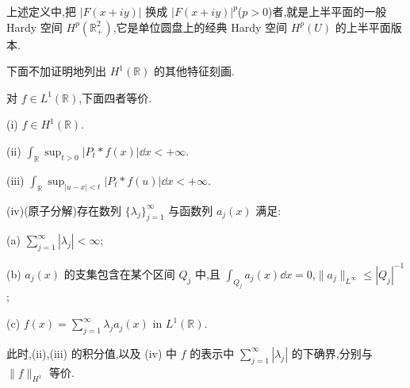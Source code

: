 上述定义中,把 $|F(x + iy)|$ 换成 $|F(x + iy)|^{p}$($p > 0$)者,就是上半平面的一般 Hardy 空间 $H^{p}(\mathbb{R}_{+}^{2})$,它是单位圆盘上的经典 Hardy 空间 $H^{p}(U)$ 的上半平面版本.

下面不加证明地列出 $H^{1}(\mathbb{R})$ 的其他特征刻画.

\begin{theorem}\label{thm:1.12.6}
对 $f \in L^{1}(\mathbb{R})$,下面四者等价.

(i) $f \in H^{1}(\mathbb{R})$.

(ii) $\displaystyle\int_{\mathbb{R}}\sup_{t>0}|P_{t} * f(x)|\dd x < +\infty$.

(iii) $\displaystyle\int_{\mathbb{R}}\sup_{|u - x| < t}|P_{t} * f(u)|\dd x < +\infty$.

(iv)(原子分解)存在数列 $\{\lambda_{j}\}_{j=1}^{\infty}$ 与函数列 $a_{j}(x)$ 满足:

(a) $\displaystyle\sum_{j=1}^{\infty}|\lambda_{j}| < \infty$;

(b) $a_{j}(x)$ 的支集包含在某个区间 $Q_{j}$ 中,且 $\int_{Q_{j}}a_{j}(x)\dd x = 0$,$\| a_{j} \|_{L^{\infty}} \leq |Q_{j}|^{-1}$;

(c) $f(x) = \displaystyle\sum_{j=1}^{\infty}\lambda_{j}a_{j}(x)$ in $L^{1}(\mathbb{R})$.

此时,(ii),(iii) 的积分值,以及 (iv) 中 $f$ 的表示中 $\displaystyle\sum_{j=1}^{\infty}|\lambda_{j}|$ 的下确界,分别与 $\| f \|_{H^{1}}$ 等价.
\end{theorem}
